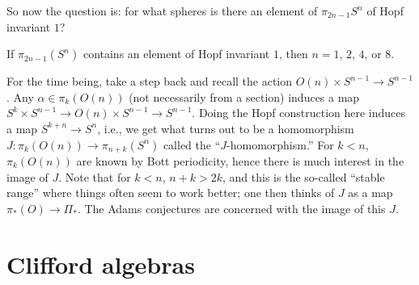 So now the question is: for what spheres is there an element of $\pi_{2n-1} S^n$ of Hopf invariant $1$?
\begin{thm}[Adams] %
If $\pi_{2n-1} (S^n)$ contains an element of Hopf invariant $1$, then $n = 1$, $2$, $4$, or $8$.
\end{thm}
For the time being, take a step back and recall the action $O(n) \times S^{n-1} \to S^{n-1}$.  Any $\alpha \in \pi_k (O(n))$ (not necessarily from a section) induces a map $S^k \times S^{n-1} \to O(n) \times S^{n-1} \to S^{n-1}$.  Doing the Hopf construction here induces a map $S^{k+n} \to S^n$, i.e., we get what turns out to be a homomorphism $J: \pi_k (O(n)) \to \pi_{n+k} (S^n)$ called the ``$J$-homomorphism.''  For $k < n$, $\pi_k (O(n))$ are known by Bott periodicity, hence there is much interest in the image of $J$.  Note that for $k < n$, $n + k > 2k$, and this is the so-called ``stable range'' where things often seem to work better; one then thinks of $J$ as a map $\pi_* (O) \to \Pi_*$.  The Adams conjectures are concerned with the image of this $J$. %

\fi
{}
\section{Clifford algebras} %
\label{CliffordAlgebras}
\ifx\OutputCliffordAlgebras\undefined\else

